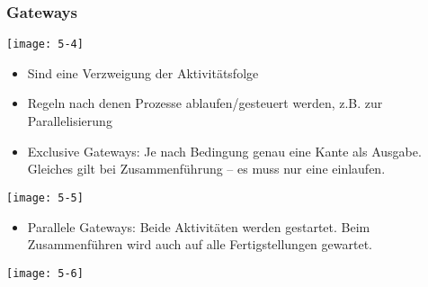 \subsubsection{Gateways}

\texttt{[image: 5-4]}

\begin{itemize}
  \item Sind eine Verzweigung der Aktivitätsfolge
  \item Regeln nach denen Prozesse ablaufen/gesteuert werden, z.B. zur Parallelisierung
  \item Exclusive Gateways: Je nach Bedingung genau eine Kante als Ausgabe. Gleiches gilt bei Zusammenführung – es muss nur eine einlaufen.
\end{itemize}

\texttt{[image: 5-5]}

\begin{itemize}
  \item Parallele Gateways: Beide Aktivitäten werden gestartet. Beim Zusammenführen wird auch auf alle Fertigstellungen gewartet.
\end{itemize}

\texttt{[image: 5-6]}